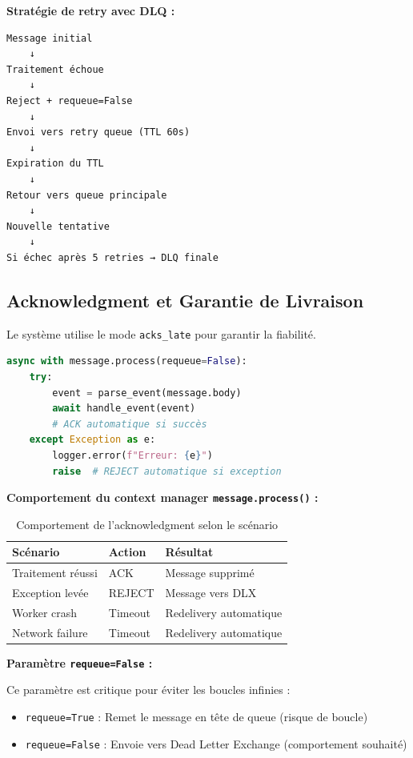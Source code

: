 \documentclass[12pt,a4paper]{article}
\begin{document}
\textbf{Stratégie de retry avec DLQ :}

\begin{verbatim}
Message initial
    ↓
Traitement échoue
    ↓
Reject + requeue=False
    ↓
Envoi vers retry queue (TTL 60s)
    ↓
Expiration du TTL
    ↓
Retour vers queue principale
    ↓
Nouvelle tentative
    ↓
Si échec après 5 retries → DLQ finale
\end{verbatim}

\subsection{Acknowledgment et Garantie de Livraison}

Le système utilise le mode \texttt{acks\_late} pour garantir la fiabilité.

\begin{lstlisting}[language=Python]
async with message.process(requeue=False):
    try:
        event = parse_event(message.body)
        await handle_event(event)
        # ACK automatique si succès
    except Exception as e:
        logger.error(f"Erreur: {e}")
        raise  # REJECT automatique si exception
\end{lstlisting}

\textbf{Comportement du context manager \texttt{message.process()} :}

\begin{table}[H]
\centering
\begin{tabular}{lll}
\toprule
\textbf{Scénario} & \textbf{Action} & \textbf{Résultat} \\
\midrule
Traitement réussi & ACK & Message supprimé \\
Exception levée & REJECT & Message vers DLX \\
Worker crash & Timeout & Redelivery automatique \\
Network failure & Timeout & Redelivery automatique \\
\bottomrule
\end{tabular}
\caption{Comportement de l'acknowledgment selon le scénario}
\end{table}

\textbf{Paramètre \texttt{requeue=False} :}

Ce paramètre est critique pour éviter les boucles infinies :
\begin{itemize}
    \item \texttt{requeue=True} : Remet le message en tête de queue (risque de boucle)
    \item \texttt{requeue=False} : Envoie vers Dead Letter Exchange (comportement souhaité)
\end{itemize}
\end{document}
